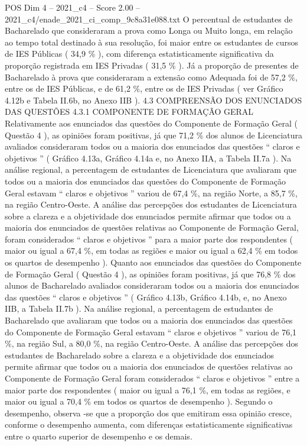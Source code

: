 \begin{textsample}{POS Dim 4 – 2021\_c4 – Score 2.00 – 2021\_c4/enade\_2021\_ci\_comp\_9c8a31e088.txt}
O percentual de estudantes de Bacharelado que consideraram a prova como Longa ou Muito longa, em relação ao tempo total destinado à sua resolução, foi maior entre os estudantes de cursos de IES Públicas ( 34,9 \% ), com diferença estatisticamente significativa da proporção registrada em IES Privadas ( 31,5 \% ).
Já a proporção de presentes de Bacharelado à prova que consideraram a extensão como Adequada foi de 57,2 \%, entre os de IES Públicas, e de 61,2 \%, entre os de IES Privadas ( ver Gráfico 4.12b e Tabela II.6b, no Anexo IIB ). 4.3 COMPREENSÃO DOS ENUNCIADOS DAS QUESTÕES 4.3.1 COMPONENTE DE FORMAÇÃO GERAL Relativamente aos enunciados das questões do Componente de Formação Geral ( Questão 4 ), as opiniões foram positivas, já que 71,2 \% dos alunos de Licenciatura avaliados consideraram todos ou a maioria dos enunciados das questões “ claros e objetivos ” ( Gráfico 4.13a, Gráfico 4.14a e, no Anexo IIA, a Tabela II.7a ).
Na análise regional, a percentagem de estudantes de Licenciatura que avaliaram que todos ou a maioria dos enunciados das questões do Componente de Formação Geral estavam “ claros e objetivos ” variou de 67,4 \%, na região Norte, a 85,7 \%, na região Centro-Oeste.
A análise das percepções dos estudantes de Licenciatura sobre a clareza e a objetividade dos enunciados permite afirmar que todos ou a maioria dos enunciados de questões relativas ao Componente de Formação Geral, foram considerados “ claros e objetivos ” para a maior parte dos respondentes ( maior ou igual a 67,4 \%, em todas as regiões e maior ou igual a 62,4 \% em todos os quartos de desempenho ).
Quanto aos enunciados das questões do Componente de Formação Geral ( Questão 4 ), as opiniões foram positivas, já que 76,8 \% dos alunos de Bacharelado avaliados consideraram todos ou a maioria dos enunciados das questões “ claros e objetivos ” ( Gráfico 4.13b, Gráfico 4.14b, e, no Anexo IIB, a Tabela II.7b ).
Na análise regional, a percentagem de estudantes de Bacharelado que avaliaram que todos ou a maioria dos enunciados das questões do Componente de Formação Geral estavam “ claros e objetivos ” variou de 76,1 \%, na região Sul, a 80,0 \%, na região Centro-Oeste.
A análise das percepções dos estudantes de Bacharelado sobre a clareza e a objetividade dos enunciados permite afirmar que todos ou a maioria dos enunciados de questões relativas ao Componente de Formação Geral foram considerados “ claros e objetivos ” entre a maior parte dos respondentes ( maior ou igual a 76,1 \%, em todas as regiões, e maior ou igual a 70,4 \% em todos os quartos de desempenho ).
Segundo o desempenho, observa -se que a proporção dos que emitiram essa opinião cresce, conforme o desempenho aumenta, com diferenças estatisticamente significativas entre o quarto superior de desempenho e os demais.

\end{textsample}
